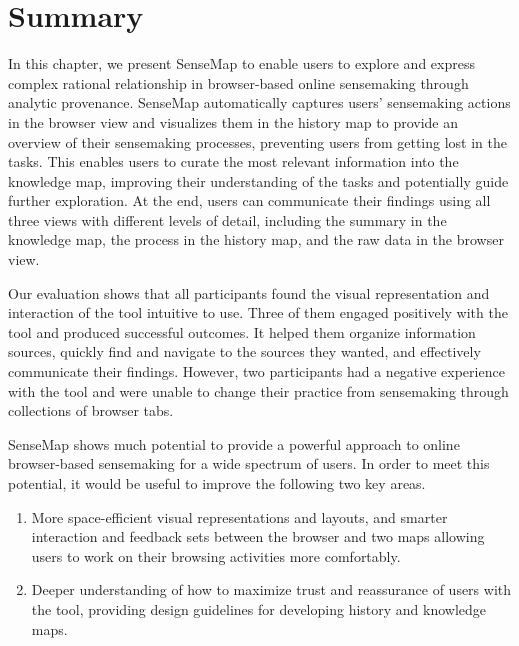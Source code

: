 \section{Summary}
In this chapter, we present SenseMap to enable users to explore and express complex rational relationship in browser-based online sensemaking through analytic provenance. SenseMap automatically captures users' sensemaking actions in the browser view and visualizes them in the history map to provide an overview of their sensemaking processes, preventing users from getting lost in the tasks. This enables users to curate the most relevant information into the knowledge map, improving their understanding of the tasks and potentially guide further exploration. At the end, users can communicate their findings using all three views with different levels of detail, including the summary in the knowledge map, the process in the history map, and the raw data in the browser view.

Our evaluation shows that all participants found the visual representation and interaction of the tool intuitive to use. Three of them engaged positively with the tool and produced successful outcomes. It helped them organize information sources, quickly find and navigate to the sources they wanted, and effectively communicate their findings. However, two participants had a negative experience with the tool and were unable to change their practice from sensemaking through collections of browser tabs.

SenseMap shows much potential to provide a powerful approach to online browser-based sensemaking for a wide spectrum of users. In order to meet this potential, it would be useful to improve the following two key areas. 
\begin{enumerate}
	\item More space-efficient visual representations and layouts, and smarter interaction and feedback sets between the browser and two maps allowing users to work on their browsing activities more comfortably. 
	\item Deeper understanding of how to maximize trust and reassurance of users with the tool, providing design guidelines for developing history and knowledge maps.
\end{enumerate}